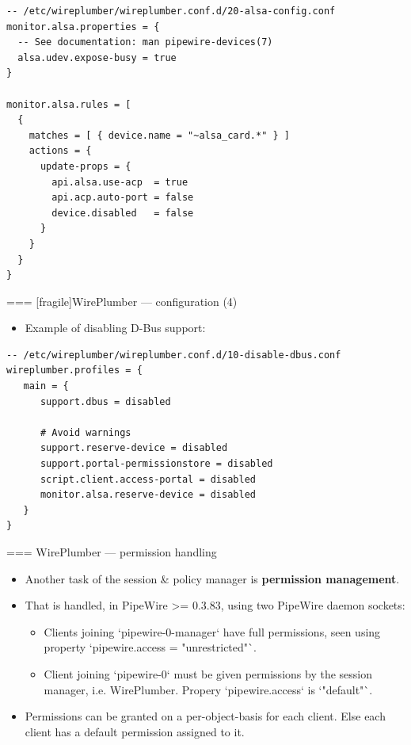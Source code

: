     \begin{block}{}
      \fontsize{10}{10}\selectfont
        \begin{verbatim}
-- /etc/wireplumber/wireplumber.conf.d/20-alsa-config.conf monitor.alsa.properties = {
  -- See documentation: man pipewire-devices(7)
  alsa.udev.expose-busy = true
}

monitor.alsa.rules = [
  {
    matches = [ { device.name = "~alsa_card.*" } ]
    actions = {
      update-props = {
        api.alsa.use-acp  = true
        api.acp.auto-port = false
        device.disabled   = false
      }
    }
  }
}
          \end{verbatim}
        \end{block}




=== [fragile]{WirePlumber — configuration (4)}
  \begin{itemize}
  \item Example of disabling D-Bus support:
  \end{itemize}

    \begin{block}{}
      \fontsize{10}{10}\selectfont
        \begin{verbatim}
-- /etc/wireplumber/wireplumber.conf.d/10-disable-dbus.conf wireplumber.profiles = {
   main = {
      support.dbus = disabled

      # Avoid warnings
      support.reserve-device = disabled
      support.portal-permissionstore = disabled
      script.client.access-portal = disabled
      monitor.alsa.reserve-device = disabled
   }
}
          \end{verbatim}
        \end{block}




=== {WirePlumber — permission handling}
  \begin{itemize}

  \item Another task of the session \& policy manager is \textbf{permission
    management}.

  \item That is handled, in PipeWire >= 0.3.83, using two PipeWire daemon sockets:

    \begin{itemize}
    \item Clients joining `pipewire-0-manager` have full permissions, seen
      using property `pipewire.access = "unrestricted"`.
    \item Client joining `pipewire-0` must be given permissions by the
      session manager, i.e. WirePlumber. Propery `pipewire.access` is
      `"default"`.
    \end{itemize}

  \item Permissions can be granted on a per-object-basis for each client. Else
    each client has a default permission assigned to it.

  \end{itemize}




